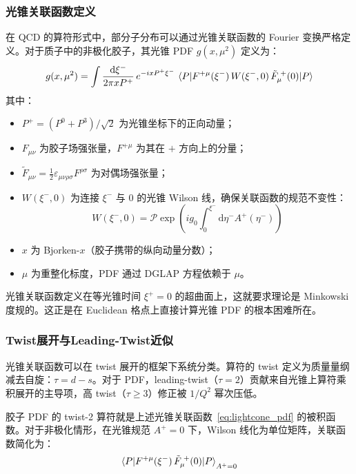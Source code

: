 \documentclass[11pt,a4paper]{ctexart}
\newcommand{\Fmunu}{F_{\mu\nu}}
\newcommand{\Ftmunu}{\tilde{F}_{\mu\nu}}
\newcommand{\eps}{\varepsilon}
\begin{document}
\subsubsection{光锥关联函数定义}

在 QCD 的算符形式中，部分子分布可以通过光锥关联函数的 Fourier 变换严格定义。对于质子中的非极化胶子，其光锥 PDF $g(x,\mu^2)$ 定义为：
\begin{equation}\label{eq:lightcone_pdf}
g(x, \mu^2) = \int \frac{\mathrm{d}\xi^{-}}{2\pi x P^{+}} \,
e^{-i x P^{+}\xi^{-}} \,
\braket{P | F^{+\mu}(\xi^{-}) \, W(\xi^{-}, 0) \, \tilde{F}_{\mu}^{\;+}(0) | P}
\end{equation}
其中：
\begin{itemize}
  \item $P^{+} = (P^{0} + P^{3})/\sqrt{2}$ 为光锥坐标下的正向动量；
  \item $\Fmunu$ 为胶子场强张量，$F^{+\mu}$ 为其在 $+$ 方向上的分量；
  \item $\Ftmunu = \tfrac{1}{2}\eps_{\mu\nu\rho\sigma}F^{\rho\sigma}$ 为对偶场强张量；
  \item $W(\xi^{-},0)$ 为连接 $\xi^{-}$ 与 $0$ 的光锥 Wilson 线，确保关联函数的规范不变性：
  \begin{equation}
  W(\xi^{-}, 0) = \mathcal{P} \exp\!\left( i g_0 \int_{0}^{\xi^{-}} \mathrm{d}\eta^{-} A^{+}(\eta^{-}) \right)
  \end{equation}
  \item $x$ 为 Bjorken-$x$（胶子携带的纵向动量分数）；
  \item $\mu$ 为重整化标度，PDF 通过 DGLAP 方程依赖于 $\mu$。
\end{itemize}

光锥关联函数定义在等光锥时间 $\xi^{+} = 0$ 的超曲面上，这就要求理论是 Minkowski 度规的。这正是在 Euclidean 格点上直接计算光锥 PDF 的根本困难所在。

\subsubsection{Twist展开与Leading-Twist近似}

光锥关联函数可以在 twist 展开的框架下系统分类。算符的 twist 定义为质量量纲减去自旋：$\tau = d - s$。对于 PDF，leading-twist（$\tau = 2$）贡献来自光锥上算符乘积展开的主导项，高 twist（$\tau \geq 3$）修正被 $1/Q^2$ 幂次压低。

胶子 PDF 的 twist-2 算符就是上述光锥关联函数~\eqref{eq:lightcone_pdf} 的被积函数。对于非极化情形，在光锥规范 $A^{+}=0$ 下，Wilson 线化为单位矩阵，关联函数简化为：
\begin{equation}
\braket{P | F^{+\mu}(\xi^{-}) \, \tilde{F}_{\mu}^{\;+}(0) | P}_{A^{+}=0}
\end{equation}
\end{document}
